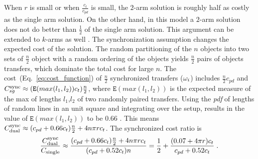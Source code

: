 When $r$ is small or when $\frac{c_t}{c_{pd}}$ is small, the $2$-arm 
solution is roughly half as costly as the single arm solution. On 
the other hand, in this model a $2$-arm solution does not do better than $\frac{1}{2}$ of 
the single arm 
solution. This argument can be extended to $k$-arms as well \cite{Shome2018WAFR}.
\vspace{-0.08in}
The synchronization assumption changes the expected cost of the solution. The random partitioning of the $n$ objects into two sets of $\frac{n}{2}$ object with a random ordering of the objects yields $\frac{n}{2}$ pairs of objects transfers, which dominate the total cost for large $n$. The cost~(Eq.~\ref{eq:cost_function}) of $\frac{n}{2}$ synchronized transfers (${\omega}_i$) includes $\frac{n}{2}c_{pd}$ and $C^{\rm sync}_{sg} \approx (\mathtt{E}(max(l_1,l_2))c_t)\frac{n}{2}$, where $\mathtt{E}(max(l_1,l_2))$ is the expected measure of the max of lengths $l_1$,$l_2$ of two randomly paired transfers. Using the \textit{pdf}\cite{ghosh1951random} of lengths of random lines in an unit square and integrating over the setup\cite{Shome2018WAFR}, results in the value of $\mathtt{E}(max(l_1,l_2))$ to be $0.66$ . 
This means $C_{\rm dual}^{\rm sync} \approx (c_{pd} + 0.66c_t)\frac{n}{2} + 4n\pi rc_t$.
The synchronized cost ratio is
\vspace{-0.1in}
\begin{equation}\label{eq:synchronized-ratio}
\frac{C_{\rm dual}^{\rm sync}}{C_{\rm single}} \approx 
\frac{(c_{pd} + 0.66c_t)\frac{n}{2} + 4n\pi rc_t}{(c_{pd} + 0.52c_t)n}
= \frac{1}{2} + \frac{ (0.07 + 4\pi r)c_t}{c_{pd} + 0.52c_t}\;.
\vspace{-0.1in}
\end{equation}

